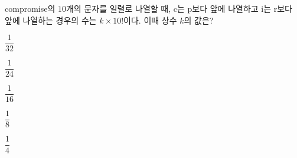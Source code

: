 compromise의 $10$개의 문자를 일렬로 나열할 때, c는 p보다 앞에 나열하고 i는 r보다 앞에 나열하는 경우의 수는 $k\times 10!$이다. 이때 상수 $k$의 값은?
\begin{choices32}{\rule[-3ex]{0pt}{8ex}$\dfrac{1}{32}$}{\rule[-3ex]{0pt}{8ex}$\dfrac{1}{24}$}{\rule[-3ex]{0pt}{8ex}$\dfrac{1}{16}$}{\rule[-3ex]{0pt}{8ex}$\dfrac{1}{8}$}{\rule[-3ex]{0pt}{8ex}$\dfrac{1}{4}$}\end{choices32}
